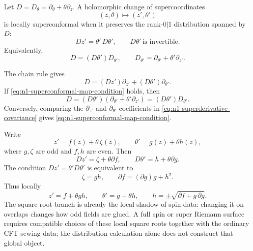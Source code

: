 \begin{definition}[\(\mathcal N=1\) local superconformal map]
\label{def:n1-local-superconformal-map}
Let \(D=D_\theta=\partial_\theta+\theta\partial_z\).  A holomorphic change of
supercoordinates
\[
  (z,\theta)\longmapsto (z',\theta')
\]
is locally superconformal when it preserves the rank-\(0|1\) distribution
spanned by \(D\):
\begin{equation}
  D z'=\theta'\,D\theta',
  \qquad
  D\theta'\ \text{is invertible}.
  \label{eq:n1-superconformal-map-condition}
\end{equation}
Equivalently,
\begin{equation}
  D=(D\theta')D_{\theta'},
  \qquad
  D_{\theta'}=\partial_{\theta'}+\theta'\partial_{z'}.
  \label{eq:n1-superderivative-covariance}
\end{equation}
\end{definition}

The chain rule gives
\[
  D=(Dz')\partial_{z'}+(D\theta')\partial_{\theta'} .
\]
If \eqref{eq:n1-superconformal-map-condition} holds, then
\[
  D=(D\theta')(\partial_{\theta'}+\theta'\partial_{z'})
  =(D\theta')D_{\theta'}.
\]
Conversely, comparing the \(\partial_{z'}\) and \(\partial_{\theta'}\)
coefficients in \eqref{eq:n1-superderivative-covariance} gives
\eqref{eq:n1-superconformal-map-condition}.

Write
\[
  z'=f(z)+\theta\,\zeta(z),
  \qquad
  \theta'=g(z)+\theta h(z),
\]
where \(g,\zeta\) are odd and \(f,h\) are even.  Then
\[
  Dz'=\zeta+\theta\partial f,
  \qquad
  D\theta'=h+\theta\partial g.
\]
The condition \(Dz'=\theta'D\theta'\) is equivalent to
\begin{equation}
  \zeta=gh,
  \qquad
  \partial f=(\partial g)g+h^2.
  \label{eq:n1-finite-superconformal-components}
\end{equation}
Thus locally
\begin{equation}
  z'=f+\theta gh,
  \qquad
  \theta'=g+\theta h,
  \qquad
  h=\pm\sqrt{\partial f+g\,\partial g}.
  \label{eq:n1-finite-superconformal-map}
\end{equation}
The square-root branch is already the local shadow of spin data: changing it
on overlaps changes how odd fields are glued.  A full spin or super Riemann
surface requires compatible choices of these local square roots together with
the ordinary CFT sewing data; the distribution calculation alone does not
construct that global object.

